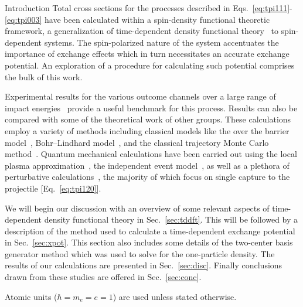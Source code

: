 \documentclass[aps, pra, reprint, groupedaddress, amsfonts,
               amsmath, amssymb, showpacs, nofootinbib]{revtex4-1}
\begin{document}
\begin{section}{Introduction \label{sec:intro}}
   Total cross sections for the processes described in Eqs.~\eqref{eq:tpi111}-\eqref{eq:tpi003} have
   been calculated within a spin-density functional theoretic~\cite{td-spindep} framework, a
   generalization of time-dependent density functional theory~\cite{tddft, ullrich} to spin-dependent
   systems. The spin-polarized nature of the system accentuates the importance of exchange effects
   which in turn necessitates an accurate exchange potential. An exploration of a procedure for
   calculating such potential comprises the bulk of this work.

   Experimental results for the various outcome channels over a large range of impact
   energies~\cite{BS58, HN78, HSE78, dCFdP88, DT-88, Dub-89, ASL91, FTFHLP-95, SSMSM-11} provide a
   useful benchmark for this process. Results can also be compared with some of the theoretical work of
   other groups. These calculations employ a variety of methods including classical models like the
   over the barrier model~\cite{CC-07}, Bohr–Lindhard model~\cite{DYC-08, DLZ-12}, and the classical
   trajectory Monte Carlo method~\cite{GMZ17}. Quantum mechanical calculations have been carried out
   using the local plasma approximation~\cite{MMA03}, the independent event model~\cite{SM-03}, as well
   as a plethora of perturbative calculations~\cite{Mancev96, BOC05, Mancev-07, MG-10, NTC11, GG-12b,
   GAG15}, the majority of which focus on single capture to the projectile [Eq.~\eqref{eq:tpi120}].

   We will begin our discussion with an overview of some relevant aspects of time-dependent density
   functional theory in Sec.\ \ref{sec:tddft}. This will be followed by a description of the method used
   to calculate a time-dependent exchange potential in Sec.~\ref{sec:xpot}. This section also includes
   some details of the two-center basis generator method which was used to solve for the one-particle
   density. The results of our calculations are presented in Sec.~\ref{sec:disc}. Finally conclusions
   drawn from these studies are offered in Sec.~\ref{sec:conc}.

   Atomic units ($\hbar = m_e = e = 1$) are used unless stated otherwise.

\end{section}
\end{document}
